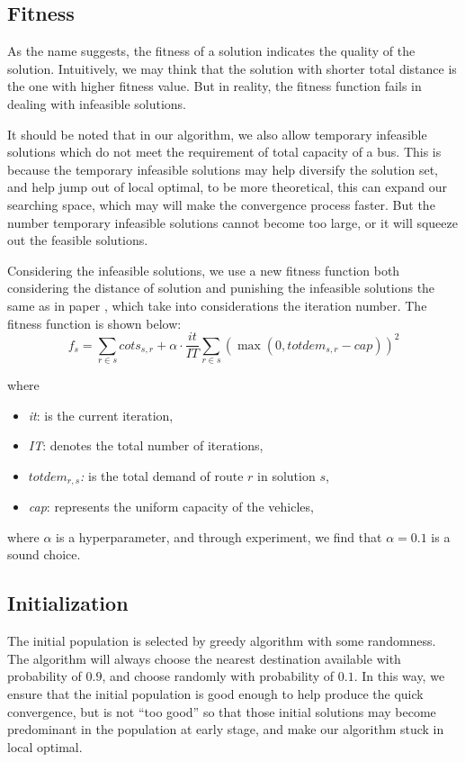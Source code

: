 \documentclass{llncs}
\begin{document}
\subsection{Fitness}
As the name suggests, the fitness of a solution indicates the quality of the solution. Intuitively, we may think that the solution with shorter total distance is the one with higher fitness value. But in reality, the fitness function fails in dealing with infeasible solutions. 

It should be noted that in our algorithm, we also allow temporary infeasible solutions which do not meet the requirement of total capacity of a bus. This is because the temporary infeasible solutions may help diversify the solution set, and help jump out of local optimal, to be more theoretical, this can expand our searching space, which may will make the convergence process faster. But the number temporary infeasible solutions cannot become too large, or it will squeeze out the feasible solutions.

Considering the infeasible solutions, we use a new fitness function both considering the distance of solution and punishing the infeasible solutions the same as in paper \cite{ga}, which take into considerations the iteration number. The fitness function is shown below:
\begin{equation}
f_s = \sum_{r\in s} cots_{s, r} + \alpha \cdot \frac{it}{IT}\sum_{r\in s}{(\max(0, totdem_{s,r} - cap))^2}
\end{equation}

where
\begin{itemize}
\item \textit{it}: is the current iteration, 
\item \textit{IT}: denotes the total number of iterations, 
\item \textit{$totdem_{r, s}$:} is the total demand of route $r$ in solution $s$, 
\item \textit{cap}: represents the uniform capacity of the vehicles, 
\end{itemize}
where $\alpha$ is a hyperparameter, and through experiment, we find that $\alpha = 0.1$ is a sound choice.
\subsection{Initialization}
The initial population is selected by greedy algorithm with some randomness. The algorithm will always choose the nearest destination available with probability of $0.9$, and choose randomly with probability of $0.1$. In this way, we ensure that the initial population is good enough to help produce the quick convergence, but is not ``too good'' so that those initial solutions may become predominant in the population at early stage, and make our algorithm stuck in local optimal.
\end{document}
